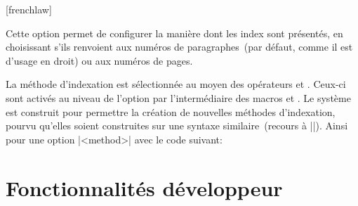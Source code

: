 \begin{noprint}
[frenchlaw]{
	\def\set@biblatexstyle{#1}
}
\end{noprint}

Cette option permet de configurer la manière dont les index sont présentés, en choisissant s'ils renvoient aux numéros de paragraphes~(par défaut, comme il est d'usage en droit) ou aux numéros de pages.

\begin{developer}
La méthode d'indexation est sélectionnée au moyen des opérateurs  et . Ceux-ci sont activés au niveau de l'option par l'intermédiaire des macros  et . Le système est construit pour permettre la création de nouvelles méthodes d'indexation, pourvu qu'elles soient construites sur une syntaxe similaire~(recours à |\csname|). Ainsi pour une option |<method>| avec le code suivant:\par
\vspace{-\baselineskip}
\end{developer}




\section{Fonctionnalités développeur}

